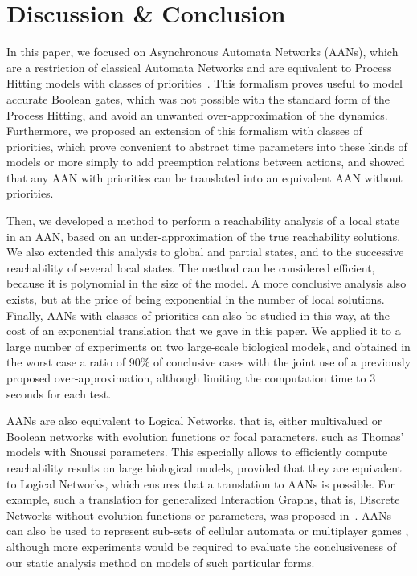 \section{Discussion \& Conclusion}\label{sec:ccl}

In this paper, we focused on Asynchronous Automata Networks (AANs),
which are a restriction of classical Automata Networks
and are equivalent to Process Hitting models with classes of priorities~\cite{FPMR13-CS2Bio}.
This formalism proves useful to model accurate Boolean gates, which was not possible
with the standard form of the Process Hitting,
and avoid an unwanted over-approximation of the dynamics.
Furthermore, we proposed an extension of this formalism with classes of priorities,
which prove convenient to abstract time parameters into these kinds of models
or more simply to add preemption relations between actions,
and showed that any AAN with priorities can be translated into
an equivalent AAN without priorities.

Then, we developed a method to perform a reachability analysis
of a local state in an AAN,
based on an under-approximation of the true reachability solutions.
We also extended this analysis to global and
partial states, and to the successive reachability of several local states.
The method can be considered efficient,
because it is polynomial in the size of the model.
A more conclusive analysis also exists,
but at the price of being exponential in the number of local solutions.
Finally, AANs with classes of priorities can also be studied in this way,
at the cost of an exponential translation that we gave in this paper.
We applied it to a large number of experiments on two large-scale
biological models, and obtained in the worst case a ratio of
90\% of conclusive cases
with the joint use of a previously proposed over-approximation,
although limiting the computation time to 3 seconds for each test.

AANs are also equivalent to Logical Networks, that is,
either multivalued or Boolean networks
with evolution functions or focal parameters,
such as Thomas' models with Snoussi parameters.
This especially allows to efficiently compute reachability results
on large biological models,
provided that they are equivalent to Logical Networks,
which ensures that a translation to AANs is possible.
For example,
such a translation for generalized Interaction Graphs,
that is, Discrete Networks without evolution functions or parameters,
was proposed in~\cite{PMR10-TCSB}.
AANs can also be used to represent sub-sets of
cellular automata \cite{cornforth_artificial_2003}
or multiplayer games \cite{gradel_infinite_2002},
although more experiments would be required to evaluate
the conclusiveness of our static analysis method on models of such particular forms.

